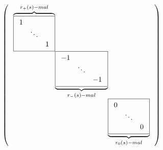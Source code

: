 \documentclass{article}
\begin{document}
\begin{preview}
\begin{equation*}
\left( \,
\begin{array}{r@{}r@{}r r r}  %
  \overbrace{
    \boxed{
      \begin{array}{rrr}    %
        1 &        &   \\
          & \ddots &   \\
          &        & 1 \\
      \end{array}
    }
  }^{r_+(s)-mal} \\
  & 
  \underbrace{
    \boxed{
      \begin{array}{rrr}    %
        -1 &        &   \\
           & \ddots &   \\
           &        & -1\\
      \end{array}
    }
  }_{r_{-}(s)-mal} \\
  & & 
  \underbrace{
    \boxed{
      \begin{array}{rrr}    %
        0  &        &  \\
           & \ddots &  \\
           &        & 0\\
      \end{array}
    }
  }_{r_0(s)-mal} \\
\end{array}\,\right)
\end{equation*}
\end{preview}
\end{document}
